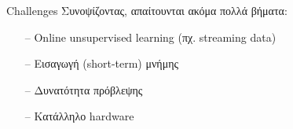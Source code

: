 \documentclass[11pt,center]{beamer}
\begin{document}
  \begin{frame}{Challenges}
  Συνοψίζοντας, απαίτουνται ακόμα πολλά βήματα:
  \vspace{+4em}
  \begin{itemize}
	\item[--] Online unsupervised learning (πχ. streaming data)
	\item[--] Εισαγωγή (short-term) μνήμης
	\item[--] Δυνατότητα πρόβλεψης
	\item[--] Κατάλληλο hardware
  \end{itemize}
  \end{frame}
\end{document}
